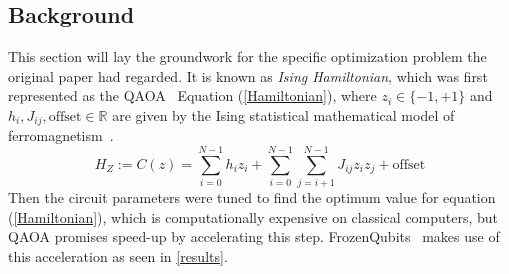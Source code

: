 \subsection{Background}
This section will lay the groundwork for the specific optimization problem the original paper had regarded. It is known as \textit{Ising Hamiltonian}, which was first represented as the QAOA~\cite{qaoa} Equation (\ref{Hamiltonian}), where $z_i\in \{-1,+1\}$ and $h_i, J_{ij},\text{offset}\in\mathbb{R}$ are given by the Ising statistical mathematical model of ferromagnetism~\cite{Ising}.
\begin{equation}\label{Hamiltonian}
    H_Z:=C(z)=\sum^{N-1}_{i=0}h_iz_i+\sum^{N-1}_{i=0}\sum^{N-1}_{j=i+1}J_{ij}z_iz_j+\text{offset}
\end{equation}
Then the circuit parameters were tuned to find the optimum value for equation (\ref{Hamiltonian}), which is computationally expensive on classical computers, but QAOA promises speed-up by accelerating this step. FrozenQubits~\cite{frozenqubits} makes use of this acceleration as seen in \ref{results}.
